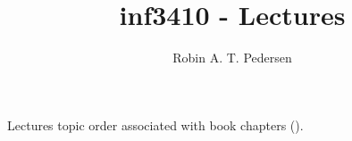 \documentclass[twocolumn]{article}
\begin{document}
  \title{inf3410 - Lectures}
  \author{Robin A. T. Pedersen}
  \maketitle

  Lectures topic order associated with book chapters (\book).
\end{document}
